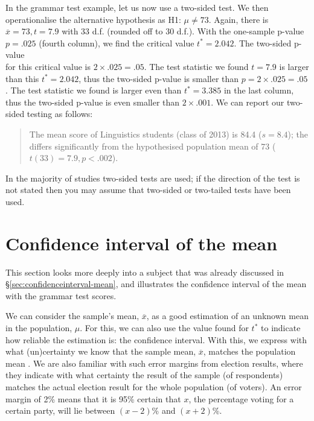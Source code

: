 \documentclass[
]{book}
\begin{document}
In the grammar test example, let us now use a two-sided test. We
then operationalise the alternative hypothesis as H1: \(\mu \ne 73\).
Again, there is \(\overline{x}=73, t=7.9\) with 33 d.f. (rounded off to 30 d.f.).
With the one-sample p-value \(p=.025\) (fourth column), we find
the critical value \(t^*=2.042\). The two-sided p-value\\
for this critical value is \(2 \times .025 = .05\). The test statistic we found
\(t=7.9\) is larger than this \(t^*=2.042\), thus the two-sided
p-value is smaller than \(p=2\times.025=.05\). The test statistic we found
is larger even than \(t^*=3.385\) in the last column,
thus the two-sided p-value is even smaller than
\(2\times.001\). We can report our two-sided testing as
follows:

\begin{quote}
The mean score of Linguistics students (class of 2013) is
84.4 (\(s=8.4\)); the differs significantly from the hypothesised
population mean of 73 (\(t(33)=7.9, p<.002\)).
\end{quote}

In the majority of studies two-sided tests are used; if the direction
of the test is not stated then you may assume that two-sided or two-tailed tests
have been used.

\hypertarget{sec:t-confidenceinterval-mean}{%
\section{Confidence interval of the mean}\label{sec:t-confidenceinterval-mean}}

This section looks more deeply into a subject that was already discussed in
§\ref{sec:confidenceinterval-mean}, and illustrates the confidence interval
of the mean with the grammar test scores.

We can consider the sample's mean, \(\overline{x}\), as a good estimation
of an unknown mean in the population,
\(\mu\). For this, we can also use the value found for \(t^*\) to indicate how
reliable the estimation is: the confidence interval. With this, we express
with what (un)certainty we know that the sample mean, \(\overline{x}\), matches
the population mean \citep{Cumm12}. We are also familiar with such error margins
from election results, where they indicate with what certainty the result
of the sample (of respondents) matches the actual election result for the whole
population (of voters). An
error margin of 2\% means that it is 95\% certain that \(x\), the percentage voting
for a certain party, will lie between \((x-2)\)\% and \((x+2)\)\%.
\end{document}
